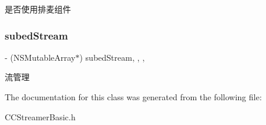 是否使用排麦组件 \mbox{\label{interface_c_c_streamer_basic_aa37da66cdd8a8790bfafd4b7bd5cac1d}} 
\subsubsection{\texorpdfstring{subed\+Stream}{subedStream}}
{\footnotesize\ttfamily -\/ (N\+S\+Mutable\+Array$\ast$) subed\+Stream\hspace{0.3cm}{\ttfamily [read]}, {\ttfamily [write]}, {\ttfamily [nonatomic]}, {\ttfamily [strong]}}

流管理 

The documentation for this class was generated from the following file\+:\begin{DoxyCompactItemize}
\item 
C\+C\+Streamer\+Basic.\+h\end{DoxyCompactItemize}
